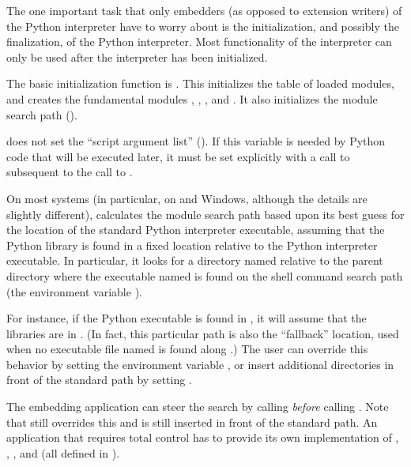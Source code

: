 \documentclass{manual}
\begin{document}
The one important task that only embedders (as opposed to extension
writers) of the Python interpreter have to worry about is the
initialization, and possibly the finalization, of the Python
interpreter.  Most functionality of the interpreter can only be used
after the interpreter has been initialized.

The basic initialization function is
.
This initializes the table of loaded modules, and creates the
fundamental modules ,
, ,
and .  It also initializes
the module search path ().%

 does not set the ``script argument list'' 
().  If this variable is needed by Python code that 
will be executed later, it must be set explicitly with a call to 
 subsequent to the call to
.

On most systems (in particular, on \UNIX{} and Windows, although the
details are slightly different),
 calculates the module search path based
upon its best guess for the location of the standard Python
interpreter executable, assuming that the Python library is found in a
fixed location relative to the Python interpreter executable.  In
particular, it looks for a directory named
 relative to the parent directory where
the executable named  is found on the shell command
search path (the environment variable ).

For instance, if the Python executable is found in
, it will assume that the libraries are in
.  (In fact, this particular path
is also the ``fallback'' location, used when no executable file named
 is found along .)  The user can override
this behavior by setting the environment variable ,
or insert additional directories in front of the standard path by
setting .

The embedding application can steer the search by calling 
 \emph{before} calling 
.  Note that  still
overrides this and  is still inserted in front of
the standard path.  An application that requires total control has to
provide its own implementation of
,
,
, and
 (all
defined in ).
\end{document}
